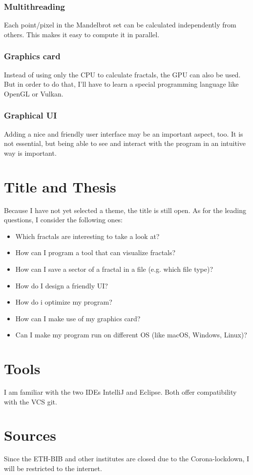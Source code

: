 \documentclass[10pt,a4paper]{article}
\begin{document}
	\subsubsection{Multithreading}
	Each point/pixel in the Mandelbrot set can be calculated independently from others. This makes it easy to compute it in parallel.
	\subsubsection{Graphics card}
	Instead of using only the CPU to calculate fractals, the GPU can also be used. But in order to do that, I'll have to learn a special programming language like OpenGL or Vulkan.
	\subsubsection{Graphical UI}
	Adding a nice and friendly user interface may be an important aspect, too. It is not essential, but being able to see and interact with the program in an intuitive way is important.
	\section{Title and Thesis}
	Because I have not yet selected a theme, the title is still open. As for the leading questions, I consider the following ones:
	\begin{itemize}
		\item Which fractals are interesting to take a look at?
		\item How can I program a tool that can visualize fractals?
		\item How can I save a sector of a fractal in a file (e.g. which file type)?
		\item How do I design a friendly UI?
		\item How do i optimize my program?
		\item How can I make use of my graphics card?
		\item Can I make my program run on different OS (like macOS, Windows, Linux)?
	\end{itemize}
	\section{Tools}
	I am familiar with the two IDEs IntelliJ and Eclipse. Both offer compatibility with the VCS git.
	\section{Sources}
	Since the ETH-BIB and other institutes are closed due to the Corona-lockdown, I will be restricted to the internet.
\end{document}
